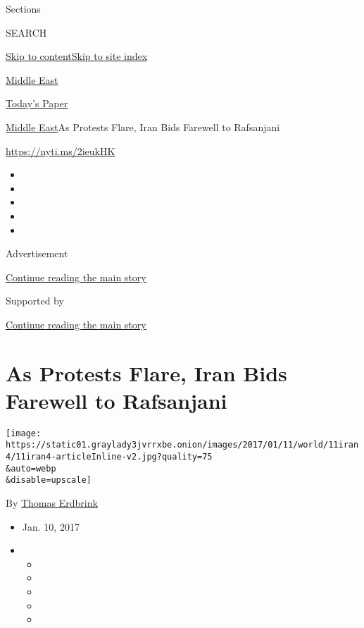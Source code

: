 Sections

SEARCH

\protect\hyperlink{site-content}{Skip to
content}\protect\hyperlink{site-index}{Skip to site index}

\href{https://www.nytimes3xbfgragh.onion/section/world/middleeast}{Middle
East}

\href{https://myaccount.nytimes3xbfgragh.onion/auth/login?response_type=cookie\&client_id=vi}{}

\href{https://www.nytimes3xbfgragh.onion/section/todayspaper}{Today's
Paper}

\href{/section/world/middleeast}{Middle East}\textbar{}As Protests
Flare, Iran Bids Farewell to Rafsanjani

\url{https://nyti.ms/2ieukHK}

\begin{itemize}
\item
\item
\item
\item
\item
\end{itemize}

Advertisement

\protect\hyperlink{after-top}{Continue reading the main story}

Supported by

\protect\hyperlink{after-sponsor}{Continue reading the main story}

\hypertarget{as-protests-flare-iran-bids-farewell-to-rafsanjani}{%
\section{As Protests Flare, Iran Bids Farewell to
Rafsanjani}\label{as-protests-flare-iran-bids-farewell-to-rafsanjani}}

\texttt{[image: https://static01.graylady3jvrrxbe.onion/images/2017/01/11/world/11iran4/11iran4-articleInline-v2.jpg?quality=75\\\&auto=webp\\\&disable=upscale]}

By \href{http://www.nytimes3xbfgragh.onion/by/thomas-erdbrink}{Thomas
Erdbrink}

\begin{itemize}
\item
  Jan. 10, 2017
\item
  \begin{itemize}
  \item
  \item
  \item
  \item
  \item
  \end{itemize}
\end{itemize}

